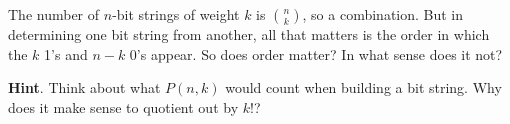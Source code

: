 \documentclass{book}
\begin{document}
\setcounter{cpjt}{117}
\addtocounter{cpjt}{-1}
\begin{activity}\label{activity-110}
\hypertarget{p-796}{}%
The number of \(n\)-bit strings of weight \(k\) is \(\binom{n}{k}\), so a combination.  But in determining one bit string from another, all that matters is the order in which the \(k\) 1's and \(n-k\) 0's appear.  So does order matter?  In what sense does it not?%
\par\smallskip%
\noindent\textbf{Hint}.\hypertarget{hint-76}{}\quad%
\hypertarget{p-797}{}%
Think about what \(P(n,k)\) would count when building a bit string.  Why does it make sense to quotient out by \(k!\)?%
\end{activity}

\clearpage
\end{document}
